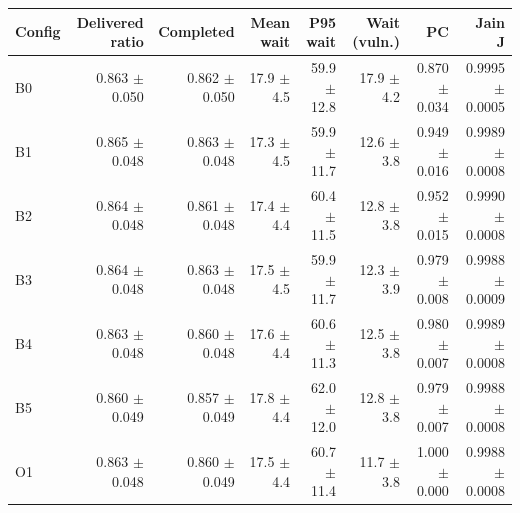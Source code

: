 \begin{tabular}{lrrrrrrr}
\hline
Config & Delivered ratio & Completed & Mean wait & P95 wait & Wait (vuln.) & PC & Jain J \\\hline
B0 & 0.863 $\pm$ 0.050 & 0.862 $\pm$ 0.050 & 17.9 $\pm$ 4.5 & 59.9 $\pm$ 12.8 & 17.9 $\pm$ 4.2 & 0.870 $\pm$ 0.034 & 0.9995 $\pm$ 0.0005 \\
B1 & 0.865 $\pm$ 0.048 & 0.863 $\pm$ 0.048 & 17.3 $\pm$ 4.5 & 59.9 $\pm$ 11.7 & 12.6 $\pm$ 3.8 & 0.949 $\pm$ 0.016 & 0.9989 $\pm$ 0.0008 \\
B2 & 0.864 $\pm$ 0.048 & 0.861 $\pm$ 0.048 & 17.4 $\pm$ 4.4 & 60.4 $\pm$ 11.5 & 12.8 $\pm$ 3.8 & 0.952 $\pm$ 0.015 & 0.9990 $\pm$ 0.0008 \\
B3 & 0.864 $\pm$ 0.048 & 0.863 $\pm$ 0.048 & 17.5 $\pm$ 4.5 & 59.9 $\pm$ 11.7 & 12.3 $\pm$ 3.9 & 0.979 $\pm$ 0.008 & 0.9988 $\pm$ 0.0009 \\
B4 & 0.863 $\pm$ 0.048 & 0.860 $\pm$ 0.048 & 17.6 $\pm$ 4.4 & 60.6 $\pm$ 11.3 & 12.5 $\pm$ 3.8 & 0.980 $\pm$ 0.007 & 0.9989 $\pm$ 0.0008 \\
B5 & 0.860 $\pm$ 0.049 & 0.857 $\pm$ 0.049 & 17.8 $\pm$ 4.4 & 62.0 $\pm$ 12.0 & 12.8 $\pm$ 3.8 & 0.979 $\pm$ 0.007 & 0.9988 $\pm$ 0.0008 \\
O1 & 0.863 $\pm$ 0.048 & 0.860 $\pm$ 0.049 & 17.5 $\pm$ 4.4 & 60.7 $\pm$ 11.4 & 11.7 $\pm$ 3.8 & 1.000 $\pm$ 0.000 & 0.9988 $\pm$ 0.0008 \\
\hline\end{tabular}
